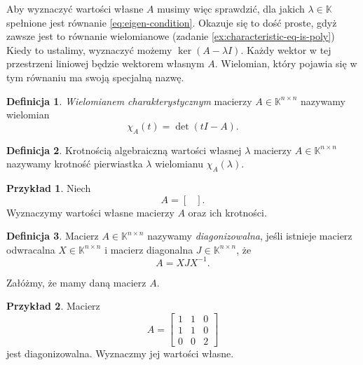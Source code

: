 \documentclass{book}
\theoremstyle{definition}
\newtheorem{definition}{Definicja}[section]
\newtheorem{example}{Przykład}[section]
\begin{document}
Aby wyznaczyć wartości własne $A$ musimy więc sprawdzić,
	dla jakich $\lambda \in \mathbb{K}$ spełnione jest równanie \ref{eq:eigen-condition}.
Okazuje się to dość proste, gdyż zawsze jest to równanie wielomianowe (zadanie \ref{ex:characteristic-eq-is-poly})
Kiedy to ustalimy,
	wyznaczyć możemy $\ker(A - \lambda I)$.
Każdy wektor w tej przestrzeni liniowej będzie wektorem własnym $A$.
Wielomian,
	który pojawia się w tym równaniu ma swoją specjalną nazwę.

\begin{definition}
	\textit{Wielomianem charakterystycznym} macierzy $A \in \mathbb{K}^{n \times n}$
		nazywamy wielomian
	\begin{equation}
		\chi_A(t) = \det(t I - A).
	\end{equation}
\end{definition}

\begin{definition}
	Krotnością algebraiczną wartości własnej $\lambda$ macierzy $A \in \mathbb{K}^{n \times n}$
		nazywamy krotność pierwiastka $\lambda$ wielomianu $\chi_A(\lambda)$.
\end{definition}

\begin{example}
	Niech
	\begin{equation}
		A = \left[\begin{matrix}
		\end{matrix}\right].
	\end{equation}
	Wyznaczymy wartości własne macierzy $A$ oraz ich krotności.
\end{example}



\begin{definition}
	Macierz $A \in \mathbb{K}^{n \times n}$ nazywamy \textit{diagonizowalna},
		jeśli istnieje macierz odwracalna $X \in \mathbb{K}^{n \times n}$
		i macierz diagonalna $J \in \mathbb{K}^{n \times n}$,
		że
	\begin{equation}
		A = X J X^{-1}.
	\end{equation}
\end{definition}

Załóżmy,
	że mamy daną macierz $A$.


\begin{example}
	Macierz
	\begin{equation}
		A = \left[\begin{matrix}
			1 & 1 & 0 \\
			1 & 1 & 0 \\
			0 & 0 & 2
		\end{matrix}\right]
	\end{equation}
	jest diagonizowalna.
	Wyznaczmy jej wartości własne.
\end{example}
\end{document}
